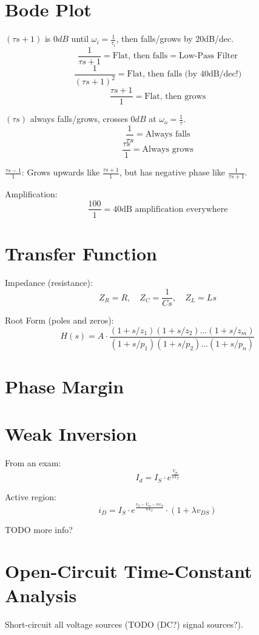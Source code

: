 \documentclass[twocolumn]{article}
\begin{document}
  \section{Bode Plot}
    $(\tau s + 1)$ is $0dB$ until $\omega_i = \frac{1}{\tau_i}$, then
    falls/grows by 20dB/dec.
    $$\frac{1}{\tau s + 1} = \text{Flat, then falls} = \text{Low-Pass Filter}$$
    $$\frac{1}{(\tau s + 1)^2} = \text{Flat, then falls (by 40dB/dec!)}$$
    $$\frac{\tau s + 1}{1} = \text{Flat, then grows}$$

    $(\tau s)$ always falls/grows, crosses $0dB$ at $\omega_o = \frac{1}{\tau}$.
    $$\frac{1}{\tau s} = \text{Always falls}$$
    $$\frac{\tau s}{1} = \text{Always grows}$$

    $\frac{\tau s - 1}{1}$:
    Grows upwards like $\frac{\tau s + 1}{1}$, but has negative phase like
    $\frac{1}{\tau s + 1}$.

    Amplification:
    $$\frac{100}{1} = \text{40dB amplification everywhere}$$

  \section{Transfer Function}
    Impedance (resistance):
    $$Z_R = R
      ,\quad Z_C = \frac{1}{Cs}
      ,\quad Z_L = Ls
      $$

    Root Form (poles and zeros):
      $$H(s) = A \cdot \frac{(1 + s/z_1)(1 + s/z_2)...(1 + s/z_m)}
                            {(1 + s/p_1)(1 + s/p_2)...(1 + s/p_n)}$$

  \section{Phase Margin}

  \section{Weak Inversion}
    From an exam:
    $$I_d = I_S \cdot e^{\frac{V_{gs}}{n V_T}}$$

    Active region:
    $$i_D = I_S \cdot e^{\frac{v_G - V_{tn} - n v_S}{nV_T}}
            \cdot (1 + \lambda v_{DS})$$

    TODO more info?

  \section{Open-Circuit Time-Constant Analysis}
    Short-circuit all voltage sources (TODO (DC?) signal sources?).
\end{document}
